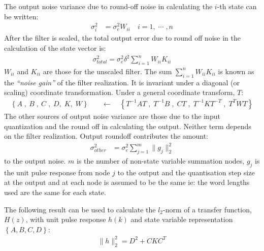 \documentclass[a4paper,twoside,10pt,english]{report}
\begin{document}
The output noise variance due to round-off noise in calculating the $i$-th
state can be written:
\begin{align*}
\sigma^{2}_{i} &= \sigma^{2}_{e}W_{ii} \quad i=1,\;\cdots\;,n
\end{align*}
After the filter is scaled, the total output error due to
round off noise in the calculation of the state vector is:
\begin{align*}
\sigma_{total}^{2}=\sigma_{e}^{2}\delta^{2}\sum^{n}_{i=1}W_{ii}K_{ii}
\end{align*}
$W_{ii}$ and $K_{ii}$ are those for the unscaled filter.
The sum $\sum^{n}_{i=1}W_{ii}K_{ii}$ is known as the \emph{``noise gain''} of 
the filter realization. It is invariant under a diagonal (or scaling)
coordinate transformation. Under a general coordinate transform, $T$:
\begin{align*}
\left\{A\;,\ B\;,\ C\;,\;D,\;K,\;W\right\}\quad&\leftarrow\quad 
\left\{T^{-1}AT\;,\; T^{-1}B\;,\;CT\;,\; T^{-1}KT^{-T}\;,\; T^{T}WT\right\}
\end{align*}
The other sources of output noise variance are those due to the
input quantization and the round off in calculating the output. Neither
term depends on the filter realization. Output roundoff contributes
the amount:
\begin{align*}
\sigma_{other}^{2}&=\sigma_{e}^{2} {\sum^{m}_{{j=1}}}\|g_{j}\|_{2}^{2}
\end{align*}
to the output noise. $m$ is the number of non-state variable summation nodes,
$g_{j}$ is the unit pulse response from node $j$ to the output and the 
quantisation step size at the output and at each node is assumed to be the 
same ie: the word lengths used are the same for each state. 

The following result can be used to calculate the $l_{2}$-norm of a transfer 
function, $H\left(z\right)$, with unit pulse response $h\left(k\right)$ and state
variable representation $\left\{A,B,C,D\right\}$:
\begin{align}
\label{eqn:Transfer-function-l2-norm-from-unit-pulse-response}
\|h\|_{2}^{2}=D^{2}+CKC^{T}
\end{align}
\end{document}
